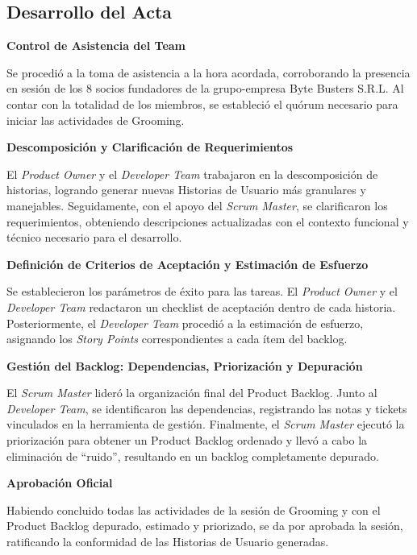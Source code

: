\newpage
\subsection{Desarrollo del Acta}

\noindent \textbf{Control de Asistencia del Team}\par
Se procedió a la toma de asistencia a la hora acordada, corroborando la presencia en sesión de los 8 socios fundadores de la grupo-empresa Byte Busters S.R.L. Al contar con la totalidad de los miembros, se estableció el quórum necesario para iniciar las actividades de Grooming.

\vspace*{0.5cm}
\noindent \textbf{Descomposición y Clarificación de Requerimientos}\par
El \textit{Product Owner} y el \textit{Developer Team} trabajaron en la descomposición de historias, logrando generar nuevas Historias de Usuario más granulares y manejables. Seguidamente, con el apoyo del \textit{Scrum Master}, se clarificaron los requerimientos, obteniendo descripciones actualizadas con el contexto funcional y técnico necesario para el desarrollo.

\vspace*{0.5cm}
\noindent \textbf{Definición de Criterios de Aceptación y Estimación de Esfuerzo}\par
Se establecieron los parámetros de éxito para las tareas. El \textit{Product Owner} y el \textit{Developer Team} redactaron un checklist de aceptación dentro de cada historia. Posteriormente, el \textit{Developer Team} procedió a la estimación de esfuerzo, asignando los \textit{Story Points} correspondientes a cada ítem del backlog.

\vspace*{0.5cm}
\noindent \textbf{Gestión del Backlog: Dependencias, Priorización y Depuración}\par
El \textit{Scrum Master} lideró la organización final del Product Backlog. Junto al \textit{Developer Team}, se identificaron las dependencias, registrando las notas y tickets vinculados en la herramienta de gestión. Finalmente, el \textit{Scrum Master} ejecutó la priorización para obtener un Product Backlog ordenado y llevó a cabo la eliminación de ``ruido'', resultando en un backlog completamente depurado.

\vspace*{0.5cm}
\noindent \textbf{Aprobación Oficial}\par
Habiendo concluido todas las actividades de la sesión de Grooming y con el Product Backlog depurado, estimado y priorizado, se da por aprobada la sesión, ratificando la conformidad de las Historias de Usuario generadas.

